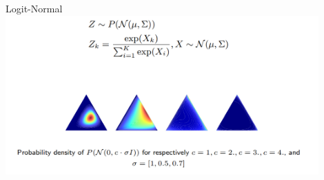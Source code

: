 \documentclass[10pt,pdf,utf8,russian,aspectratio=169]{beamer}
\begin{document}
\begin{frame}{Logit-Normal}
\includegraphics[width=0.9\textwidth]{logn.png}
\begin{centering}
\end{centering}
\end{frame}
\end{document}
